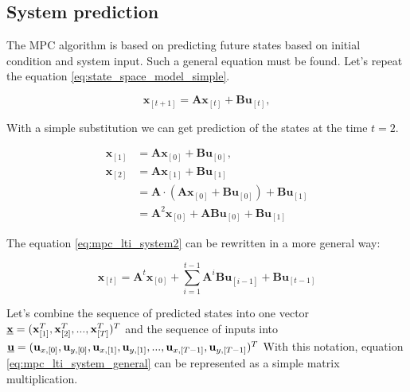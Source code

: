 \documentclass{article}
\begin{document}
\subsection{System prediction}
The MPC algorithm is based on predicting future states based on initial condition and system input. Such a general equation must be found. Let's repeat the equation \ref{eq:state_space_model_simple}.

\begin{equation}
\textbf{x}_{[t+1]} = \textbf{A}\textbf{x}_{[t]} + \textbf{B}\textbf{u}_{[t]},
\label{eq:mpc_lti_system}
\end{equation}

With a simple substitution we can get prediction of the states at the time $t = 2$.

\begin{equation}
\begin{split}
\label{eq:mpc_lti_system2}
\textbf{x}_{[1]} &= \textbf{A}\textbf{x}_{[0]} + \textbf{B}\textbf{u}_{[0]},\\
\textbf{x}_{[2]} &= \textbf{A}\textbf{x}_{[1]} + \textbf{B}\textbf{u}_{[1]}\\
&= \textbf{A}\cdot(\textbf{A}\textbf{x}_{[0]} + \textbf{B}\textbf{u}_{[0]}) + \textbf{B}\textbf{u}_{[1]} \\
&=\textbf{A}^2\textbf{x}_{[0]} + \textbf{A}\textbf{B}\textbf{u}_{[0]} + \textbf{B} \textbf{u}_{[1]}
\end{split}
\end{equation}

The equation \ref{eq:mpc_lti_system2} can be rewritten in a more general way:

\begin{equation}
\label{eq:mpc_lti_system_general}
\textbf{x}_{[t]} =\textbf{A}^t\textbf{x}_{[0]} + 
\sum_{i = 1}^{t-1}\textbf{A}^{i}\textbf{B}\textbf{u}_{[i-1]} + \textbf{B} \textbf{u}_{[t-1]}
\end{equation}

Let's combine the sequence of predicted states into one vector $\textbf{\underline{x}} = (\textbf{x}_{[1]}^T, \textbf{x}_{[2]}^T, ..., \textbf{x}_{[T]}^T)^T$ and the sequence of inputs into 
$\textbf{\underline{u}} = (\textbf{u}_{x,[0]}, \textbf{u}_{y,[0]}, \textbf{u}_{x,[1]}, \textbf{u}_{y,[1]}, ..., \textbf{u}_{x,[T-1]}, \textbf{u}_{y,[T-1]})^T$
With this notation, equation \ref{eq:mpc_lti_system_general} can be represented as a simple matrix multiplication.
\end{document}
